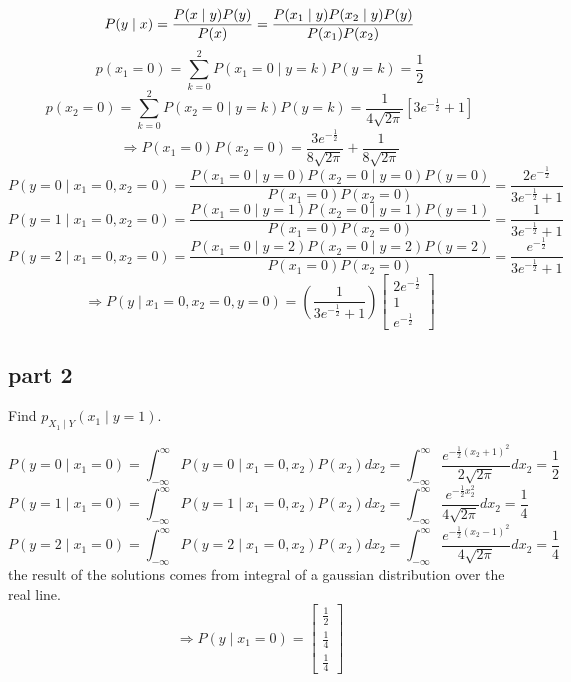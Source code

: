 \begin{qsolve}
	\begin{qsolve}[]
		$$
		P(y \mid x) = \frac{P(x \mid y) P(y)}{P(x)} = \frac{P(x_1 \mid y)P(x_2\mid y) P(y)}{P(x_1) P(x_2)} \\
		$$
		$$
		p(x_1=0) = \sum_{k=0}^{2}P(x_1=0\mid y=k)P(y=k) = \frac{1}{2}
		$$
		$$
		p(x_2=0) = \sum_{k=0}^{2}P(x_2=0\mid y=k)P(y=k) = \frac{1}{4\sqrt{2\pi}}[3e^{-\frac{1}{2}} + 1]
		$$
		$$
		\Rightarrow P(x_1 = 0) P(x_2 = 0) = \frac{3e^{-\frac{1}{2}}}{8\sqrt{2\pi}} + \frac{1}{8\sqrt{2\pi}}
		$$
		$$
		P(y = 0 \mid x_1 = 0, x_2 = 0) = \frac{P(x_1 = 0 \mid y = 0) P(x_2 = 0 \mid y = 0) P(y = 0)}{P(x_1 = 0) P(x_2 = 0)} = \frac{2e^{-\frac{1}{2}}}{3e^{-\frac{1}{2}}+1}
		$$
		$$
		P(y = 1 \mid x_1 = 0, x_2 = 0) = \frac{P(x_1 = 0 \mid y = 1) P(x_2 = 0 \mid y = 1) P(y = 1)}{P(x_1 = 0) P(x_2 = 0)} = \frac{1}{3e^{-\frac{1}{2}}+1}
		$$
		$$
		P(y = 2 \mid x_1 = 0, x_2 = 0) = \frac{P(x_1 = 0 \mid y = 2) P(x_2 = 0 \mid y = 2) P(y = 2)}{P(x_1 = 0) P(x_2 = 0)} = \frac{e^{-\frac{1}{2}}}{3e^{-\frac{1}{2}}+1}
		$$
		$$
		\Rightarrow P(y \mid x_1 = 0, x_2 = 0, y = 0) = (\frac{1}{3e^{-\frac{1}{2}}+1}) \begin{bmatrix} 2e^{-\frac{1}{2}} \\ 1 \\ e^{-\frac{1}{2}} \end{bmatrix}
		$$
	\end{qsolve}
\end{qsolve}

\subsection{part 2}
Find $p_{X_1 \mid Y}(x_1 \mid y = 1)$.

\begin{qsolve}
	\begin{qsolve}[]
		$$P(y=0\mid x_1=0) = \int_{-\infty}^{\infty}P(y=0\mid x_1=0,x_2)P(x_2)dx_2 = \int_{-\infty}^{\infty}\frac{e^{-\frac{1}{2}(x_2+1)^2}}{2\sqrt{2\pi}}dx_2 = \frac{1}{2}$$
		$$P(y=1\mid x_1=0) = \int_{-\infty}^{\infty}P(y=1\mid x_1=0,x_2)P(x_2)dx_2 = \int_{-\infty}^{\infty}\frac{e^{-\frac{1}{2}x_2^2}}{4\sqrt{2\pi}}dx_2 = \frac{1}{4}$$
		$$P(y=2\mid x_1=0) = \int_{-\infty}^{\infty}P(y=2\mid x_1=0,x_2)P(x_2)dx_2 = \int_{-\infty}^{\infty}\frac{e^{-\frac{1}{2}(x_2-1)^2}}{4\sqrt{2\pi}}dx_2 = \frac{1}{4}$$
		the result of the solutions comes from integral of a gaussian distribution over the real line.
		$$\Rightarrow P(y\mid x_1=0) = \begin{bmatrix} \frac{1}{2} \\ \frac{1}{4} \\ \frac{1}{4} \end{bmatrix}$$
	\end{qsolve}
\end{qsolve}


